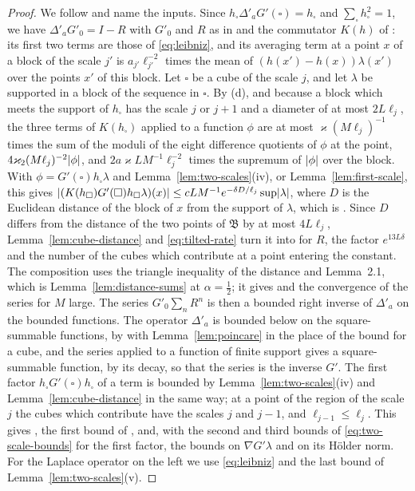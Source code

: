 \documentclass[11pt]{preprint}
\DeclarePairedDelimiter{\abs}{\lvert}{\rvert}
\numberwithin{equation}{section}
\theoremstyle{definition}
\theoremstyle{remark}
\theoremstyle{plain}
\begin{document}
\begin{proof}
We follow \cite[(2.37)--(2.66)]{BalabanPRT2} and name the inputs. Since $h_\square\Delta'_aG'(\square) = h_\square$ and $\sum_\square h_\square^2 = 1$, we have $\Delta'_aG'_0 = I - R$ with $G'_0$ and $R$ as in \cite[(2.37), (2.38)]{BalabanPRT2} and the commutator $K(h)$ of \cite[(2.39)]{BalabanPRT2}: its first two terms are those of \eqref{eq:leibniz}, and its averaging term at a point $x$ of a block of the scale $j'$ is $a_{j'}\ell_{j'}^{-2}$ times the mean of $(h(x') - h(x))\lambda(x')$ over the points $x'$ of this block. Let $\square$ be a cube of the scale $j$, and let $\lambda$ be supported in a block of the sequence in $\square$. By (d), and because a block which meets the support of $h_\square$ has the scale $j$ or $j + 1$ and a diameter of at most $2L\ell_j$, the three terms of $K(h_\square)$ applied to a function $\phi$ are at most $\varkappa(M\ell_j)^{-1}$ times the sum of the moduli of the eight difference quotients of $\phi$ at the point, $4\varkappa_2(M\ell_j)^{-2}\abs\phi$, and $2a\varkappa LM^{-1}\ell_j^{-2}$ times the supremum of $\abs\phi$ over the block. With $\phi = G'(\square)h_\square\lambda$ and Lemma~\ref{lem:two-scales}(iv), or Lemma~\ref{lem:first-scale}, this gives $\abs{(K(h_\square)G'(\square)h_\square\lambda)(x)} \leq cLM^{-1}e^{-\delta D/\ell_j}\sup\abs\lambda$, where $D$ is the Euclidean distance of the block of $x$ from the support of $\lambda$, which is \cite[(2.44)]{BalabanPRT2}. Since $D$ differs from the distance of the two points of $\mathfrak B$ by at most $4L\ell_j$, Lemma~\ref{lem:cube-distance} and \eqref{eq:tilted-rate} turn it into \cite[(2.51)]{BalabanPRT2} for $R$, the factor $e^{13L\delta}$ and the number of the cubes which contribute at a point entering the constant. The composition \cite[(2.52)--(2.56)]{BalabanPRT2} uses the triangle inequality of the distance and Lemma~2.1, which is Lemma~\ref{lem:distance-sums} at $\alpha = \frac12$; it gives \cite[(2.64), (2.65)]{BalabanPRT2} and the convergence of the series for $M$ large. The series $G'_0\sum_nR^n$ is then a bounded right inverse of $\Delta'_a$ on the bounded functions. The operator $\Delta'_a$ is bounded below on the square-summable functions, by \cite[(2.11)]{BalabanPRT2} with Lemma~\ref{lem:poincare} in the place of the bound for a cube, and the series applied to a function of finite support gives a square-summable function, by its decay, so that the series is the inverse $G'$. The first factor $h_\square G'(\square)h_\square$ of a term is bounded by Lemma~\ref{lem:two-scales}(iv) and Lemma~\ref{lem:cube-distance} in the same way; at a point of the region of the scale $j$ the cubes which contribute have the scales $j$ and $j - 1$, and $\ell_{j-1} \leq \ell_j$. This gives \cite[(2.66)]{BalabanPRT2}, the first bound of \cite[(2.67)]{BalabanPRT2}, and, with the second and third bounds of \eqref{eq:two-scale-bounds} for the first factor, the bounds on $\nabla G'\lambda$ and on its H\"older norm. For the Laplace operator on the left we use \eqref{eq:leibniz} and the last bound of Lemma~\ref{lem:two-scales}(v).


\end{proof}
\end{document}
